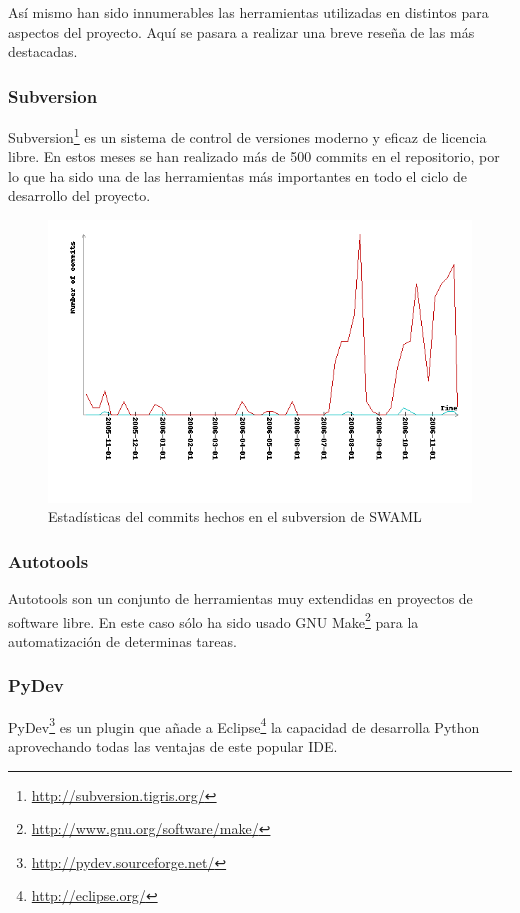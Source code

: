 Así mismo han sido innumerables las herramientas utilizadas en distintos para 
aspectos del proyecto. Aquí se pasara a realizar una breve reseña de las más 
destacadas.

\subsubsection{Subversion}

Subversion\footnote{\url{http://subversion.tigris.org/}} es un sistema de 
control de versiones moderno y eficaz de licencia libre. En estos meses se 
han realizado más de 500 commits en el repositorio, por lo que ha sido una
de las herramientas más importantes en todo el ciclo de desarrollo del
proyecto.

\begin{figure}[H]
	\centering
	\includegraphics[width=12cm]{images/svn-stats.png}
	\caption{Estadísticas del commits hechos en el subversion de SWAML}
	\label{fig:svnStats}
\end{figure}

\subsubsection{Autotools}

Autotools son un conjunto de herramientas muy extendidas en proyectos de
software libre. En este caso sólo ha sido usado GNU Make\footnote{\url{http://www.gnu.org/software/make/}}
para la automatización de determinas tareas.

\subsubsection{PyDev}

PyDev\footnote{\url{http://pydev.sourceforge.net/}} es un plugin que añade
a Eclipse\footnote{\url{http://eclipse.org/}} la capacidad de desarrolla
Python aprovechando todas las ventajas de este popular IDE.

